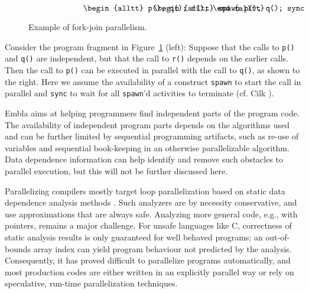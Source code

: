 \begin{figure}
\small
\hrulefill
\[
\begin{minipage}[t]{3cm}
\begin{alltt}
   p();
   q();
   r();
\end{alltt}
\end{minipage}
\begin{minipage}[t]{3cm}
\begin{alltt}
   spawn p();
   q();
   sync;
   r();
\end{alltt}
\end{minipage} 
\]
\hrulefill
\caption{Example of fork-join parallelism.}
\label{fforkjoin}
\end{figure}

Consider the program fragment in
Figure~\ref{fforkjoin} (left):
Suppose that the calls to {\tt p()} and {\tt q()} are independent,
but that the call to {\tt r()} depends on the earlier calls. Then
the call to {\tt p()} can be
executed in parallel with
the call to {\tt q()}, as shown to the right.
Here we assume the availability of a construct {\tt spawn} to start
the call in parallel and {\tt sync} to wait for all {\tt spawn}'d
activities to terminate (cf. Cilk
).

Embla aims at helping programmers find independent parts of the 
program code.  The availability of independent program parts depends on
the algorithms used and can be further
limited by sequential programming artifacts, such as re-use of
variables and sequential book-keeping in an otherwise parallelizable
algorithm.  Data dependence information can help
identify and remove such obstacles to parallel execution, but this
will not be further discussed here.

Parallelizing compilers mostly target loop parallelization based on
static data dependence analysis methods
.  Such analyzers
are by necessity conservative, and use approximations that are always
safe.  Analyzing more general code, e.g., with pointers, remains a
major challenge. For unsafe languages like C, correctness of static
analysis results is only guaranteed for well behaved programs; an
out-of-bounds array index can yield program behaviour not predicted by
the analysis. Consequently, it has proved difficult to parallelize
programs automatically, and most production codes are either written
in an explicitly parallel way or rely on speculative, run-time
parallelization techniques.

